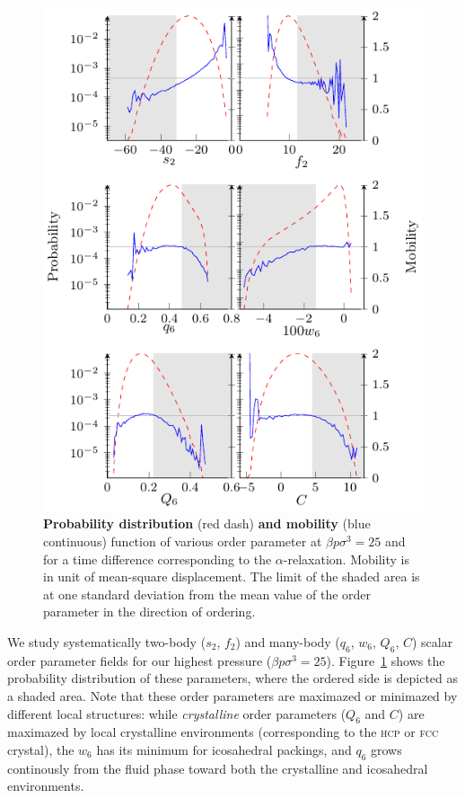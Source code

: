 \documentclass[twocolumn,superscriptaddress]{revtex4-1}
\begin{document}
\begin{figure}
	\centering
	\includegraphics{fig_distrib}
	\caption{\textbf{Probability distribution} (red dash) \textbf{and mobility} (blue continuous) function of various order parameter at $\beta p\sigma^3=25$ and for a time difference corresponding to the $\alpha$-relaxation. Mobility is in unit of mean-square displacement. The limit of the shaded area is at one standard deviation from the mean value of the order parameter in the direction of ordering.}
	\label{fig:distrib}
\end{figure}

We study systematically two-body ($s_2$, $f_2$) and many-body ($q_6$, $w_6$, $Q_6$, $C$) scalar order parameter fields for our highest pressure ($\beta p\sigma^3=25$). Figure~\ref{fig:distrib} shows the probability distribution of these parameters, where the ordered side is depicted as a shaded area. Note that these order parameters are maximazed or
minimazed by different local structures: while \emph{crystalline} order parameters ($Q_6$ and $C$) are maximazed
by local crystalline environments (corresponding to the \textsc{hcp} or \textsc{fcc} crystal), the $w_6$ has its minimum for
icosahedral packings, and $q_6$ grows continously from the fluid phase toward both the crystalline and icosahedral environments.
\end{document}
